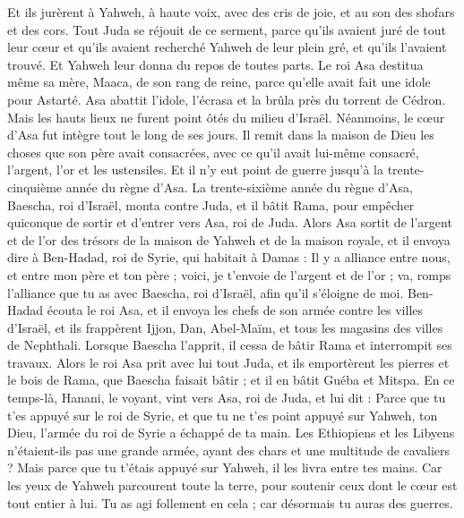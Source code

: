 \begin{multicols}{2}
Et ils jurèrent à Yahweh, à haute voix, avec des cris de joie, et au son des shofars et des cors.
Tout Juda se réjouit de ce serment, parce qu'ils avaient juré de tout leur cœur et qu'ils avaient recherché Yahweh de leur plein gré, et qu'ils l'avaient trouvé. Et Yahweh leur donna du repos de toutes parts.
Le roi Asa destitua même sa mère, Maaca, de son rang de reine, parce qu'elle avait fait une idole pour Astarté. Asa abattit l’idole, l’écrasa et la brûla près du torrent de Cédron.
Mais les hauts lieux ne furent point ôtés du milieu d'Israël. Néanmoins, le cœur d'Asa fut intègre tout le long de ses jours.
Il remit dans la maison de Dieu les choses que son père avait consacrées, avec ce qu'il avait lui-même consacré, l'argent, l'or et les ustensiles.
Et il n'y eut point de guerre jusqu'à la trente-cinquième année du règne d'Asa.
\VerseOne{}La trente-sixième année du règne d'Asa, Baescha, roi d'Israël, monta contre Juda, et il bâtit Rama, pour empêcher quiconque de sortir et d’entrer vers Asa, roi de Juda.
Alors Asa sortit de l'argent et de l'or des trésors de la maison de Yahweh et de la maison royale, et il envoya dire à Ben-Hadad, roi de Syrie, qui habitait à Damas :
Il y a alliance entre nous, et entre mon père et ton père ; voici, je t'envoie de l'argent et de l'or ; va, romps l'alliance que tu as avec Baescha, roi d'Israël, afin qu'il s'éloigne de moi.
Ben-Hadad écouta le roi Asa, et il envoya les chefs de son armée contre les villes d'Israël, et ils frappèrent Ijjon, Dan, Abel-Maïm, et tous les magasins des villes de Nephthali.
Lorsque Baescha l'apprit, il cessa de bâtir Rama et interrompit ses travaux.
Alors le roi Asa prit avec lui tout Juda, et ils emportèrent les pierres et le bois de Rama, que Baescha faisait bâtir ; et il en bâtit Guéba et Mitspa.
En ce temps-là, Hanani, le voyant, vint vers Asa, roi de Juda, et lui dit : Parce que tu t'es appuyé sur le roi de Syrie, et que tu ne t'es point appuyé sur Yahweh, ton Dieu, l'armée du roi de Syrie a échappé de ta main.
Les Ethiopiens et les Libyens n'étaient-ils pas une grande armée, ayant des chars et une multitude de cavaliers ? Mais parce que tu t'étais appuyé sur Yahweh, il les livra entre tes mains.
Car les yeux de Yahweh parcourent toute la terre, pour soutenir ceux dont le cœur est tout entier à lui. Tu as agi follement en cela ; car désormais tu auras des guerres.

\end{multicols}

